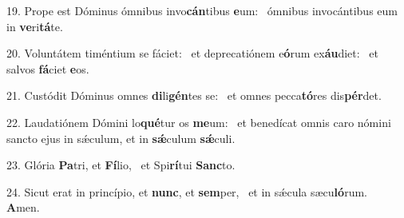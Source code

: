 19. Prope est Dóminus ómnibus invo\textbf{cán}tibus \textbf{e}um: \ast\  ómnibus invocántibus eum in \textbf{ve}ri\textbf{tá}te.\

20. Voluntátem timéntium se fáciet: \dag\  et deprecatiónem e\textbf{ó}rum ex\textbf{áu}diet: \ast\  et salvos \textbf{fá}ciet \textbf{e}os.\

21. Custódit Dóminus omnes \textbf{di}li\textbf{gén}tes se: \ast\  et omnes pecca\textbf{tó}res dis\textbf{pér}det.\

22. Laudatiónem Dómini lo\textbf{qué}tur os \textbf{me}um: \ast\  et benedícat omnis caro nómini sancto ejus in sǽculum, et in \textbf{sǽ}culum \textbf{sǽ}culi.\

23. Glória \textbf{Pa}tri, et \textbf{Fí}lio, \ast\  et Spi\textbf{rí}tui \textbf{Sanc}to.\

24. Sicut erat in princípio, et \textbf{nunc}, et \textbf{sem}per, \ast\  et in sǽcula sæcu\textbf{ló}rum. \textbf{A}men.\


